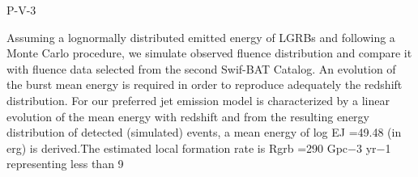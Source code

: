 P-V-3


\bigskip



\bigskip

\noindent Assuming a lognormally distributed emitted energy of LGRBs and following a Monte Carlo procedure, we simulate observed fluence distribution and compare it with fluence data selected from the second Swif-BAT Catalog. An evolution of the burst mean energy is required in order to reproduce adequately the redshift distribution.
For our preferred jet emission model is characterized by a linear evolution of the mean energy with redshift and from the resulting energy distribution of detected (simulated) events, a mean energy of log EJ =49.48 (in erg) is derived.The estimated local formation rate is Rgrb =290 Gpc−3 yr−1 representing less than 9%

